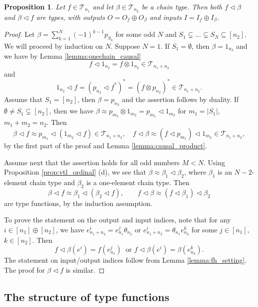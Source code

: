 \documentclass[12pt]{article}
\newtheorem{prop}{Proposition}
\theoremstyle{definition}
\theoremstyle{remark}
\def\Te{\mathcal T}
\def\vtl{\vartriangleleft}
\begin{document}
\begin{prop}\label{prop:append_chain_f}  Let $f\in \Te_{n_1}$ and let $\beta\in \Te_{n_2}$
be a chain type. Then both $f\vtl \beta$ and $\beta\vtl f$ are types, with outputs
$O=O_f\oplus O_\beta$ and inputs $I=I_f\oplus I_\beta$. 

\end{prop}

\begin{proof} Let  $\beta=\sum_{k=1}^{N}(-1)^{k-1}p_{S_k}$
for some odd $N$ and $S_1\subsetneq \dots \subsetneq S_N\subseteq [n_2]$. We will proceed
by induction on $N$. Suppose $N=1$. If $S_1=\emptyset$,
then $\beta=1_{n_2}$ and we have by Lemma \ref{lemma:onechain_causal}
\[
f\vtl 1_{n_2}=f\otimes 1_{n_2}\in \Te_{n_1+n_2}
\]
and
\[
1_{n_2}\vtl f=(p_{n_2}\vtl f^*)^*=(f\otimes p_{n_2})^*\in \Te_{n_1+n_2}.
\]
Assume that  $S_1=[n_2]$, then $\beta=p_{n_2}$ and the assertion follows by duality. 
If $\emptyset\ne S_1\subsetneq [n_2]$, then we have $\beta\approx p_{m_1}\otimes
1_{m_2}=p_{m_1}\vtl 1_{m_2}$ for $m_1=|S_1|$, $m_1+m_2=n_2$. Then 
\[
\beta\vtl f\approx p_{m_1}\vtl (1_{m_2}\vtl f)\in \Te_{n_1+n_2},\quad f\vtl \beta\approx (f\vtl p_{m_1})\vtl 1_{m_2} \in
\Te_{n_1+n_2},
\]
by the first part of the proof and Lemma \ref{lemma:causal_product}.

Assume next that the assertion holds for all odd numbers $M<N$. Using Proposition
\ref{prop:vtl_ordinal} (d), we see that $\beta\approx \beta_1\vtl\beta_2$, where $\beta_1$ is
an $N-2$-element chain type and $\beta_2$ is a one-element chain  type. Then
\[
\beta\vtl f\approx \beta_1\vtl(\beta_2\vtl f),\qquad f\vtl\beta\approx (f\vtl\beta_1)\vtl\beta_2
\]
are type functions, by the induction assumption. 


To prove the statement on the output and input indices, note that for any $i\in [n_1]\oplus [n_2]$, we have  $e^i_{n_1+n_2}=e^j_{n_1}\theta_{n_2}$ or
$e^i_{n_1+n_2}=\theta_{n_1}e^k_{n_2}$
for some $j\in [n_1]$, $k\in [n_2]$. Then   
\[
f\vtl\beta(e^i)=f(e^j_{n_1})\ \text{ or } f\vtl \beta(e^i)=\beta(e^k_{n_2}).
\]
The statement on input/output indices  follow from Lemma \ref{lemma:fh_setting}. The proof
for $\beta\vtl f$ is similar. 

\end{proof}


\subsection{The structure of type functions}
\end{document}

